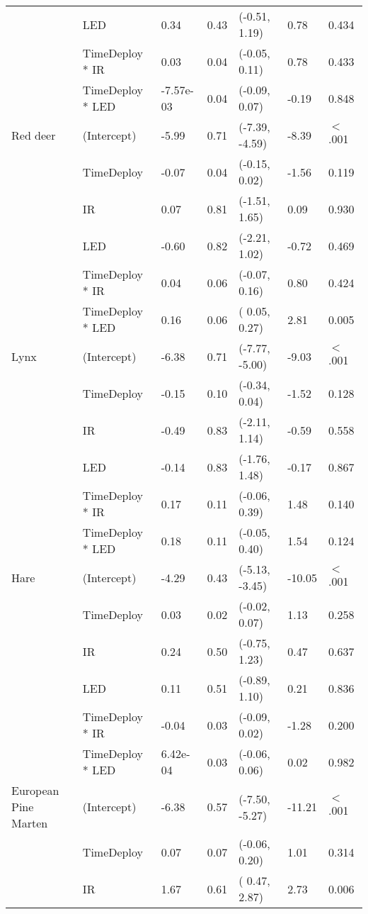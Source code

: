 \begin{table}[ht]
\begin{tabular}{lllllll}
   & LED & 0.34 & 0.43 & (-0.51,  1.19) & 0.78 & 0.434  \\ 
   & TimeDeploy * IR & 0.03 & 0.04 & (-0.05,  0.11) & 0.78 & 0.433  \\ 
   & TimeDeploy * LED & -7.57e-03 & 0.04 & (-0.09,  0.07) & -0.19 & 0.848  \\ 
  Red deer & (Intercept) & -5.99 & 0.71 & (-7.39, -4.59) & -8.39 & $<$ .001 \\ 
   & TimeDeploy & -0.07 & 0.04 & (-0.15,  0.02) & -1.56 & 0.119  \\ 
   & IR & 0.07 & 0.81 & (-1.51,  1.65) & 0.09 & 0.930  \\ 
   & LED & -0.60 & 0.82 & (-2.21,  1.02) & -0.72 & 0.469  \\ 
   & TimeDeploy * IR & 0.04 & 0.06 & (-0.07,  0.16) & 0.80 & 0.424  \\ 
   & TimeDeploy * LED & 0.16 & 0.06 & ( 0.05,  0.27) & 2.81 & 0.005  \\ 
  Lynx & (Intercept) & -6.38 & 0.71 & (-7.77, -5.00) & -9.03 & $<$ .001 \\ 
   & TimeDeploy & -0.15 & 0.10 & (-0.34,  0.04) & -1.52 & 0.128  \\ 
   & IR & -0.49 & 0.83 & (-2.11,  1.14) & -0.59 & 0.558  \\ 
   & LED & -0.14 & 0.83 & (-1.76,  1.48) & -0.17 & 0.867  \\ 
   & TimeDeploy * IR & 0.17 & 0.11 & (-0.06,  0.39) & 1.48 & 0.140  \\ 
   & TimeDeploy * LED & 0.18 & 0.11 & (-0.05,  0.40) & 1.54 & 0.124  \\ 
  Hare & (Intercept) & -4.29 & 0.43 & (-5.13, -3.45) & -10.05 & $<$ .001 \\ 
   & TimeDeploy & 0.03 & 0.02 & (-0.02,  0.07) & 1.13 & 0.258  \\ 
   & IR & 0.24 & 0.50 & (-0.75,  1.23) & 0.47 & 0.637  \\ 
   & LED & 0.11 & 0.51 & (-0.89,  1.10) & 0.21 & 0.836  \\ 
   & TimeDeploy * IR & -0.04 & 0.03 & (-0.09,  0.02) & -1.28 & 0.200  \\ 
   & TimeDeploy * LED & 6.42e-04 & 0.03 & (-0.06,  0.06) & 0.02 & 0.982  \\ 
  European Pine Marten & (Intercept) & -6.38 & 0.57 & (-7.50, -5.27) & -11.21 & $<$ .001 \\ 
   & TimeDeploy & 0.07 & 0.07 & (-0.06,  0.20) & 1.01 & 0.314  \\ 
   & IR & 1.67 & 0.61 & ( 0.47,  2.87) & 2.73 & 0.006  \\ 

\end{tabular}
\end{table}
